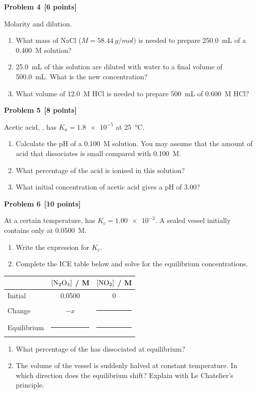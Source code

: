 \documentclass[11pt,a4paper]{article}
\newcommand{\problem}[2]{\bigskip\par\textbf{Problem #1}\ \textbf{[#2]}\par\nopagebreak\smallskip}
\newcommand{\blank}{\rule{2.4cm}{0.4pt}}
\begin{document}
\problem{4}{6 points}
Molarity and dilution.
\begin{enumerate}
  \item What mass of NaCl ($M = \qty{58.44}{g/mol}$) is needed to prepare \qty{250.0}{mL} of a
        \qty{0.400}{M} solution?
  \item \qty{25.0}{mL} of this solution are diluted with water to a final volume of \qty{500.0}{mL}.
        What is the new concentration?
  \item What volume of \qty{12.0}{M} HCl is needed to prepare \qty{500}{mL} of \qty{0.600}{M} HCl?
\end{enumerate}

\problem{5}{8 points}
Acetic acid, , has $K_a = \num{1.8e-5}$ at \qty{25}{\celsius}.
\begin{enumerate}
  \item Calculate the pH of a \qty{0.100}{M} solution. You may assume that the amount of acid that
        dissociates is small compared with \qty{0.100}{M}.
  \item What percentage of the acid is ionised in this solution?
  \item What initial concentration of acetic acid gives a pH of $3.00$?
\end{enumerate}

\problem{6}{10 points}
At a certain temperature,  has $K_c = \num{1.00e-2}$. A sealed vessel
initially contains only  at \qty{0.0500}{M}.
\begin{enumerate}
  \item Write the expression for $K_c$.
  \item Complete the ICE table below and solve for the equilibrium concentrations.
\end{enumerate}
\begin{center}
\begin{tabular}{lcc}
\toprule
 & $[\ce{N2O4}]$ / M & $[\ce{NO2}]$ / M \\
\midrule
Initial     & 0.0500 & 0 \\
Change      & $-x$   & \blank \\
Equilibrium & \blank & \blank \\
\bottomrule
\end{tabular}
\end{center}
\begin{enumerate}[resume]
  \item What percentage of the  has dissociated at equilibrium?
  \item The volume of the vessel is suddenly halved at constant temperature. In which direction does the
        equilibrium shift? Explain with Le Chatelier's principle.
\end{enumerate}
\end{document}
